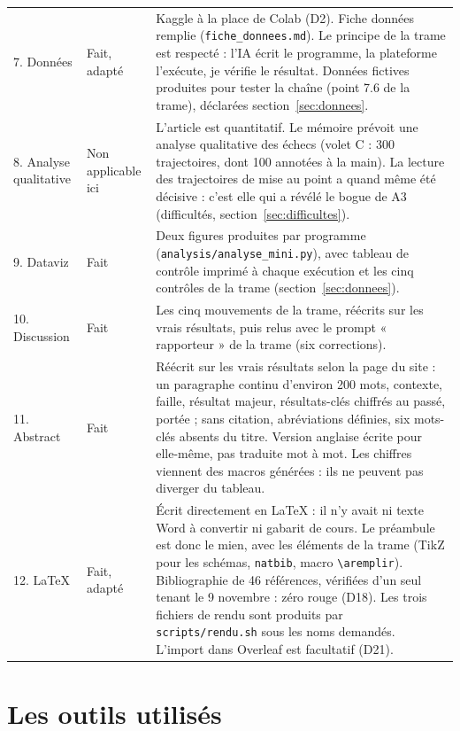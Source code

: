 \documentclass[10pt,a4paper]{article}
\newcommand{\f}[1]{\texttt{\small #1}}
\begin{document}
\begin{longtable}{@{}P{1.9cm}P{2.6cm}P{11.2cm}@{}}
7. Données & Fait, adapté & Kaggle à la place de Colab (D2). Fiche données remplie (\f{fiche\_donnees.md}). Le principe de la trame est respecté : l'IA écrit le programme, la plateforme l'exécute, je vérifie le résultat. Données fictives produites pour tester la chaîne (point 7.6 de la trame), déclarées section~\ref{sec:donnees}.\\
8. Analyse qualitative & Non applicable ici & L'article est quantitatif. Le mémoire prévoit une analyse qualitative des échecs (volet C : 300 trajectoires, dont 100 annotées à la main). La lecture des trajectoires de mise au point a quand même été décisive : c'est elle qui a révélé le bogue de A3 (difficultés, section~\ref{sec:difficultes}).\\
9. Dataviz & Fait & Deux figures produites par programme (\f{analysis/analyse\_mini.py}), avec tableau de contrôle imprimé à chaque exécution et les cinq contrôles de la trame (section~\ref{sec:donnees}).\\
10. Discussion & Fait & Les cinq mouvements de la trame, réécrits sur les vrais résultats, puis relus avec le prompt « rapporteur » de la trame (six corrections).\\
11. Abstract & Fait & Réécrit sur les vrais résultats selon la page du site : un paragraphe continu d'environ 200 mots, contexte, faille, résultat majeur, résultats-clés chiffrés au passé, portée ; sans citation, abréviations définies, six mots-clés absents du titre. Version anglaise écrite pour elle-même, pas traduite mot à mot. Les chiffres viennent des macros générées : ils ne peuvent pas diverger du tableau.\\
12. LaTeX & Fait, adapté & Écrit directement en LaTeX : il n'y avait ni texte Word à convertir ni gabarit de cours. Le préambule est donc le mien, avec les éléments de la trame (TikZ pour les schémas, \f{natbib}, macro \f{\textbackslash aremplir}). Bibliographie de 46 références, vérifiées d'un seul tenant le 9 novembre : zéro rouge (D18). Les trois fichiers de rendu sont produits par \f{scripts/rendu.sh} sous les noms demandés. L'import dans Overleaf est facultatif (D21).\\
\bottomrule
\end{longtable}
\normalsize

\section{Les outils utilisés}
\end{document}
